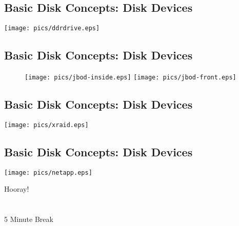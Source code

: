 \documentclass[xga]{xdvislides}
\begin{document}
\subsection{Basic Disk Concepts: Disk Devices}
	\begin{center}
		\texttt{[image: pics/ddrdrive.eps]} \\
	\end{center}

\subsection{Basic Disk Concepts: Disk Devices}
\begin{figure}[hb]
	\begin{center}
		\texttt{[image: pics/jbod-inside.eps]}
		\hspace*{15mm}
		\texttt{[image: pics/jbod-front.eps]} \\
	\end{center}
\end{figure}


\subsection{Basic Disk Concepts: Disk Devices}
	\begin{center}
		\texttt{[image: pics/xraid.eps]} \\
	\end{center}


\subsection{Basic Disk Concepts: Disk Devices}
	\begin{center}
		\texttt{[image: pics/netapp.eps]} \\
	\end{center}


\newpage
\vspace*{\fill}
\begin{center}
    \Hugesize
        Hooray! \\ [1em]
    \hspace*{5mm}
    \blueline\\
    \hspace*{5mm}\\
        5 Minute Break
\end{center}
\vspace*{\fill}
\end{document}
